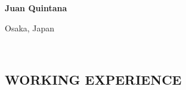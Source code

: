 \documentclass[9pt,letterpaper]{extreport}
\begin{document}

\begin{minipage}{0.50\textwidth}
\begingroup

   \fontsize{26pt}{20pt}\selectfont \textbf{Juan Quintana} 



\endgroup
\end{minipage}
\begin{minipage}{0.3\textwidth}

\begin{flushright}
\textcolor{NavyBlue}{{ Osaka, Japan}}

\textcolor{NavyBlue}{}

\textcolor{NavyBlue}{}


\end{flushright}
\end{minipage}
\begin{minipage}{0.15\textwidth}
\end{minipage}
\\



\vspace{-1em} %
\subsection*{\textcolor{NavyBlue}{ \fontsize{12pt}{20pt}\selectfont \textbf{WORKING EXPERIENCE} }}
\end{document}
